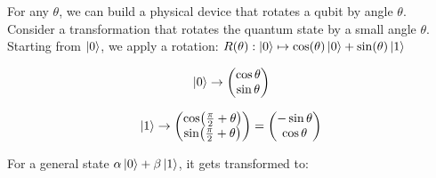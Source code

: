 \begin{definition}
For any $\theta$, we can build a physical device that rotates a qubit by angle $\theta$. Consider a transformation that rotates the quantum state by a small angle $\theta$. Starting from $\ket{0}$, we apply a rotation:
$R(\theta): \ket{0} \mapsto \cos(\theta)\ket{0} + \sin(\theta)\ket{1}$

$$\ket{0} \to \begin{pmatrix} \cos\theta \\ \sin\theta \end{pmatrix}$$

$$\ket{1} \to \begin{pmatrix} \cos(\frac{\pi}{2} + \theta) \\ \sin(\frac{\pi}{2} + \theta) \end{pmatrix} = \begin{pmatrix} -\sin\theta \\ \cos\theta \end{pmatrix}$$

\begin{center}
\end{center}

For a general state $\alpha\ket{0} + \beta\ket{1}$, it gets transformed to:


\end{definition}

